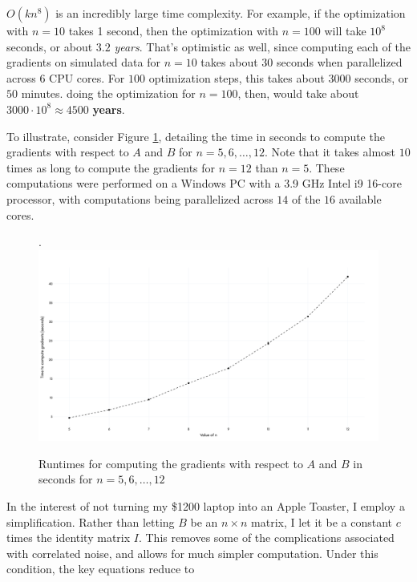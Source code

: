 \documentclass{article}
\theoremstyle{definition}
\begin{document}
$O(kn^8)$ is an incredibly large time complexity. For example, if the optimization with $n=10$ takes 1 second, then the optimization with $n=100$ will take $10^8$ seconds, or about $3.2$ \textit{years}. That's optimistic as well, since computing each of the gradients on simulated data for $n=10$ takes about $30$ seconds when parallelized across 6 CPU cores. For $100$ optimization steps, this takes about $3000$ seconds, or $50$ minutes. doing the optimization for $n=100$, then, would take about $3000 \cdot 10^8 \approx 4500$ \textbf{years}.

To illustrate, consider Figure \ref{fig:runtime}, detailing the time in seconds to compute the gradients with respect to $A$ and $B$ for $n = 5, 6, \ldots, 12$. Note that it takes almost $10$ times as long to compute the gradients for $n=12$ than $n=5$. These computations were performed on a Windows PC with a 3.9 GHz Intel i9 16-core processor, with computations being parallelized across $14$ of the $16$ available cores.

\begin{figure}[hbt!]
    \vspace{0.1in}
    \par
    \begin{center}
    \caption{Runtimes for computing the gradients with respect to $A$ and $B$ in seconds for $n = 5, 6, \ldots, 12$}.
    \label{fig:runtime}
    \includegraphics[scale=0.11]{Figures/runtime.png}
    \end{center}
    \par
    \vspace{-0.25in}
    \medskip
\end{figure}

In the interest of not turning my \$1200 laptop into an Apple Toaster, I employ a simplification. Rather than letting $B$ be an $n \times n$ matrix, I let it be a constant $c$ times the identity matrix $I$. This removes some of the complications associated with correlated noise, and allows for much simpler computation. Under this condition, the key equations reduce to
\end{document}
